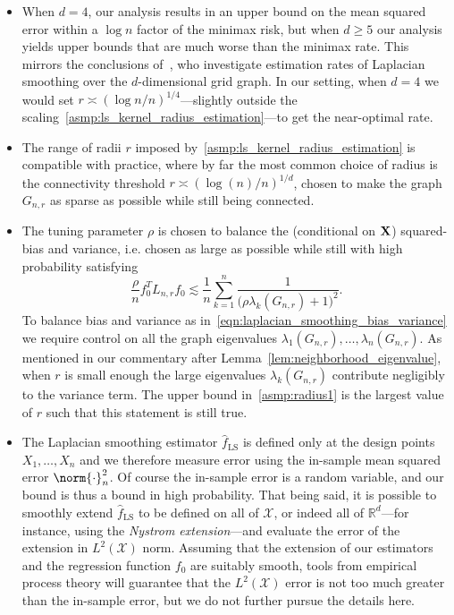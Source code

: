 \documentclass{article}
\newcommand{\Reals}{\mathbb{R}}
\newcommand{\1}{\mathbf{1}}
\newcommand{\Lap}{L}
\newcommand{\Xset}{\mathcal{X}}
\newcommand{\Leb}{L}
\newcommand{\wh}[1]{\widehat{#1}}
\newcommand{\LS}{\mathrm{LS}}
\theoremstyle{alden}
\theoremstyle{aldenthm}
\theoremstyle{definition}
\theoremstyle{remark}
\begin{document}
\begin{itemize}
	\item When $d = 4$, our analysis results in an upper bound on the mean squared error within a $\log n$ factor of the minimax risk, but when $d \geq 5$ our analysis yields upper bounds that are much worse than the minimax rate. This mirrors the conclusions of~\cite{sadhanala16}, who investigate estimation rates of Laplacian smoothing over the $d$-dimensional grid graph. In our setting, when $d = 4$ we would set $r \asymp (\log n/n)^{1/4}$---slightly outside the scaling~\ref{asmp:ls_kernel_radius_estimation}---to get the near-optimal rate.
	\item The range of radii $r$ imposed by~\ref{asmp:ls_kernel_radius_estimation} is  compatible with practice, where by far the most common choice of radius is the connectivity threshold $r \asymp (\log(n)/n)^{1/d}$, chosen to make the graph $G_{n,r}$ as sparse as possible while still being connected. 
	\item The tuning parameter $\rho$ is chosen to balance the (conditional on ${\bf X}$) squared-bias and variance, i.e. chosen as large as possible while still with high probability satisfying
	\begin{equation}
	\label{eqn:laplacian_smoothing_bias_variance}
	\frac{\rho}{n} f_0^T \Lap_{{n,r}} f_0 \lesssim \frac{1}{n}\sum_{k = 1}^{n} \frac{1}{\bigl(\rho \lambda_{k}(G_{n,r}) + 1\bigr)^2}.
	\end{equation}
	To balance bias and variance as in~\eqref{eqn:laplacian_smoothing_bias_variance} we require control on all the graph eigenvalues $\lambda_1(G_{n,r}),\ldots,\lambda_n(G_{n,r})$. As mentioned in our commentary after Lemma~\ref{lem:neighborhood_eigenvalue}, when $r$ is small enough the large eigenvalues $\lambda_k(G_{n,r})$ contribute negligibly to the variance term. The upper bound in~\ref{asmp:radius1} is the largest value of $r$ such that this statement is still true.
	\item The Laplacian smoothing estimator $\wh{f}_{\LS}$ is defined only at the design points $X_1,\ldots,X_n$ and we therefore measure error using the in-sample mean squared error $\norm{\cdot}_n^2$. Of course the in-sample error is a random variable, and our bound is thus a bound in high probability. That being said, it is possible to smoothly extend $\wh{f}_{\LS}$ to be defined on all of $\Xset$, or indeed all of $\Reals^d$---for instance, using the \emph{Nystrom extension}---and evaluate the error of the extension in $\Leb^2(\Xset)$ norm. Assuming that the extension of our estimators and the regression function $f_0$ are suitably smooth, tools from empirical process theory will guarantee that the $\Leb^2(\Xset)$ error is not too much greater than the in-sample error, but we do not further pursue the details here.
\end{itemize}
\end{document}
